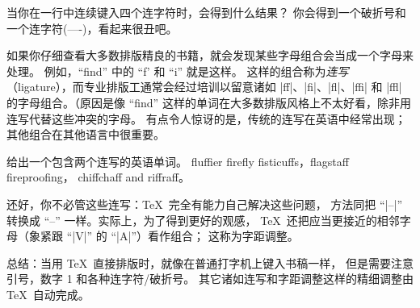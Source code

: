 \exercise 当你在一行中连续键入四个连字符时，会得到什么结果？
\answer 你会得到一个破折号和一个连字符(----)，看起来很丑吧。
\smallskip

如果你仔细查看大多数排版精良的书籍，就会发现某些字母组合会当成一个字母来处理。
例如，``find'' 中的 ``f' 和 ``i'' 就是这样。
这样的组合称为{\sl 连写}（ligature），而专业排版工通常会经过培训以留意诸如
|ff|、|fi|、|fl|、|ffi| 和 |ffl| 的字母组合。（原因是像 ``f{}ind''
这样的单词在大多数排版风格上不太好看，除非用连写代替这些冲突的字母。
有点令人惊讶的是，传统的连写在英语中经常出现；其他组合在其他语言中很重要。

\exercise 给出一个包含两个连写的英语单词。
\answer fluffier firefly fisticuffs，flagstaff fireproofing，
chiffchaff and riffraff。
\smallskip

还好，你{不必}管这些连写：\TeX\ 完全有能力自己解决这些问题，
方法同把 ``|--|'' 转换成 ``--'' 一样。实际上，为了得到更好的观感，
\TeX\ 还把应当更接近的相邻字母（象紧跟 ``|V|'' 的 ``|A|''）看作组合；
这称为{字距调整}。

\medbreak
\1总结：当用 \TeX\ 直接排版时，就像在普通打字机上键入书稿一样，
但是需要注意引号，数字 1 和各种连字符/破折号。
其它诸如连写和字距调整这样的精细调整由 \TeX\ 自动完成。

